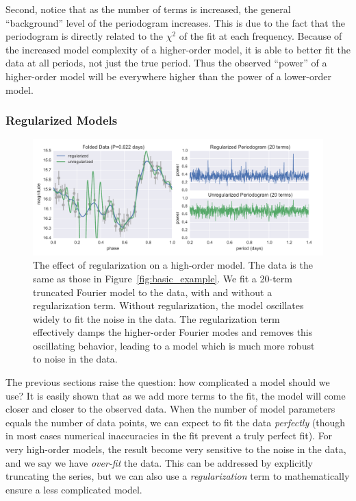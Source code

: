\documentclass[12pt,preprint]{aastex}
\newcommand{\Fig}[1]{Figure~\ref{fig:#1}}
\newcommand{\fig}[1]{\Fig{#1}}
\newcommand{\figlabel}[1]{\label{fig:#1}}
\newcommand{\sectlabel}[1]{\label{sect:#1}}
\begin{document}
Second, notice that as the number of terms is increased, the general ``background'' level of the periodogram increases. This is due to the fact that the periodogram is directly related to the $\chi^2$ of the fit at each frequency. Because of the increased model complexity of a higher-order model, it is able to better fit the data at all periods, not just the true period. Thus the observed ``power'' of a higher-order model will be everywhere higher than the power of a lower-order model.

\subsubsection{Regularized Models}
\sectlabel{regularization}

\begin{figure}
  \centering
  \includegraphics[width=\textwidth]{fig04.pdf}
  \caption{
    The effect of regularization on a high-order model. The data is the same as
    those in \fig{basic_example}. We fit a 20-term truncated Fourier model to
    the data, with and without a regularization term. Without regularization,
    the model oscillates widely to fit the noise in the data. The
    regularization term effectively damps the higher-order Fourier modes and
    removes this oscillating behavior, leading to a model which is much more
    robust to noise in the data.
  }
  \figlabel{regularized_example}
\end{figure}

The previous sections raise the question: how complicated a model should we use? It is easily shown that as we add more terms to the fit, the model will come closer and closer to the observed data. When the number of model parameters equals the number of data points, we can expect to fit the data {\it perfectly} (though in most cases numerical inaccuracies in the fit prevent a truly perfect fit). For very high-order models, the result become very sensitive to the noise in the data, and we say we have {\it over-fit} the data. This can be addressed by explicitly truncating the series, but we can also use a {\it regularization} term to mathematically ensure a less complicated model.
\end{document}
